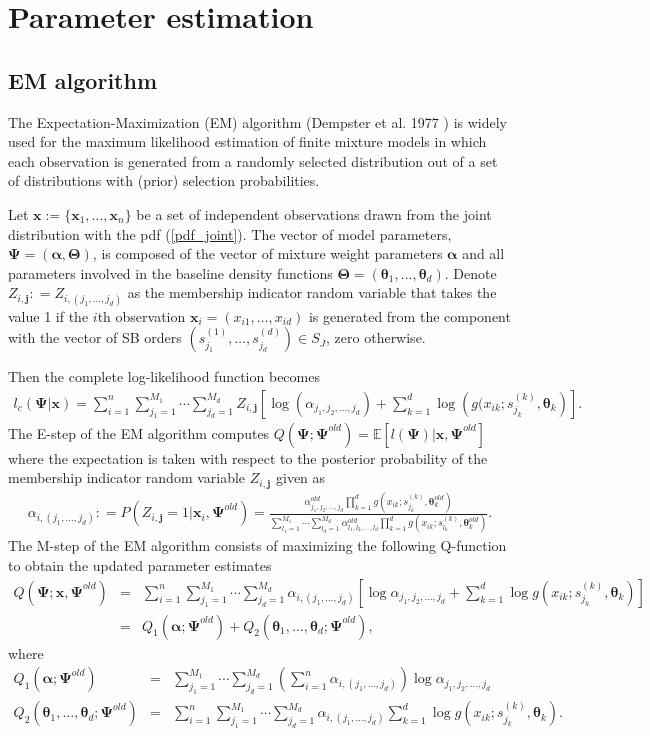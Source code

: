 \documentclass[11pt]{article}
\def\a{\alpha} \def\b{\beta}
\def\bea{\begin{eqnarray*}} \def\eea{\end{eqnarray*}}
\def\beq{\begin{eqnarray}} \def\eeq{\end{eqnarray}}
\def\mE{\mathbb{E}}
\begin{document}
\section{Parameter estimation}\label{sec4}
\subsection{EM algorithm}\label{em}
The Expectation-Maximization (EM) algorithm (Dempster et al. 1977 \nocite{dempster1977maximum}) is widely used for the maximum likelihood estimation of finite mixture models in which each observation is generated from a randomly selected distribution out of a set of distributions with (prior) selection probabilities.   
 
Let $\bm{x} := \{\bm{x}_1, \ldots, \bm{x}_n\}$ be a set of independent observations drawn from the joint distribution with the pdf (\ref{pdf_joint}). The vector of model parameters, $\bm{\Psi} = (\bm{\a}, \bm{\Theta})$, is composed of the vector of mixture weight parameters $\bm{\a}$ and all parameters involved in the baseline density functions $\bm{\Theta} = (\bm{\theta}_1,\ldots, \bm{\theta}_d)$. Denote $Z_{i,\bm{j}} : = Z_{i, (j_1,\ldots,j_d)}$ as the membership indicator random variable that takes the value 1 if the $i$th observation $\bm{x}_i = (x_{i1},\ldots,x_{id})$ is generated from the component with the vector of SB orders $(s^{(1)}_{j_1},\ldots, s^{(d)}_{j_d}) \in S_J$, zero otherwise. 

Then the complete log-likelihood function becomes
\bea
l_c(\bm{\Psi}|\bm{x}) = \sum_{i=1}^n \sum_{j_1 = 1}^{M_1} \cdots\sum_{j_d = 1}^{M_d} Z_{i,\bm{j}}\left[\log(\a_{j_1,j_2,\ldots,j_d}) + \sum_{k=1}^d \log\left(g(x_{ik};s^{(k)}_{j_k}, \bm{\theta}_k\right)\right].
\eea
The E-step of the EM algorithm computes $Q(\bm{\Psi};\bm{\Psi}^{old}) = \mE[l(\bm{\Psi}) |\bm{x}, \bm{\Psi}^{old}]$ where the expectation is taken with respect to the posterior probability of the membership indicator random variable $Z_{i,\bm{j}}$ given as
\bea
\a_{i,(j_1,\ldots,j_d)} : = P(Z_{i,\bm{j}} = 1 | \bm{x}_i, \bm{\Psi}^{old}) =  \frac{\a^{old}_{j_1,j_2,\ldots,j_d} \prod_{k=1}^d g(x_{ik};s^{(k)}_{j_k}, \bm{\theta}^{old}_k)}{\sum_{l_1 = 1}^{M_1} \cdots\sum_{l_d = 1}^{M_d}\a^{old}_{l_1,l_2,\ldots,l_d} \prod_{k=1}^d g(x_{ik};s^{(k)}_{l_k}, \bm{\theta}^{old}_k)}.
\eea
The M-step of the EM algorithm consists of maximizing the following Q-function to obtain the updated parameter estimates 
\beq\label{Estep}\nonumber
Q(\bm{\Psi};\bm{x}, \bm{\Psi}^{old}) &=& \sum_{i=1}^n \sum_{j_1 = 1}^{M_1} \cdots\sum_{j_d = 1}^{M_d} \a_{i,(j_1,\ldots,j_d)}\left[\log \a_{j_1,j_2,\ldots,j_d} + \sum_{k=1}^d \log g(x_{ik};s^{(k)}_{j_k}, \bm{\theta}_k)\right]\\
&=& Q_1(\bm{\a};\bm{\Psi}^{old}) + Q_2(\bm{\theta}_1,\ldots, \bm{\theta}_d;\bm{\Psi}^{old}), 
\eeq
where
\bea
Q_1(\bm{\a};\bm{\Psi}^{old})  &=& \sum_{j_1 = 1}^{M_1} \cdots\sum_{j_d = 1}^{M_d} \left(\sum_{i=1}^n \a_{i,(j_1,\ldots,j_d)}\right)\log \a_{j_1,j_2,\ldots,j_d}\\
Q_2(\bm{\theta}_1,\ldots, \bm{\theta}_d;\bm{\Psi}^{old}) &=& \sum_{i=1}^n \sum_{j_1 = 1}^{M_1} \cdots\sum_{j_d = 1}^{M_d} \a_{i,(j_1,\ldots,j_d)}\sum_{k=1}^d \log g(x_{ik};s^{(k)}_{j_k}, \bm{\theta}_k).
\eea
\end{document}
